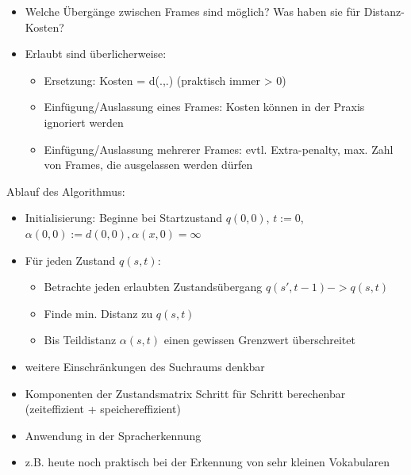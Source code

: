 \documentclass[a4paper,10pt,oneside]{article}
\begin{document}
 		\begin{itemize}
 			\item Welche Übergänge zwischen Frames sind möglich? Was haben sie für Distanz-Kosten?
 			\item Erlaubt sind überlicherweise:
 				\begin{itemize}
 					\item Ersetzung: Kosten = d(.,.) (praktisch immer > 0)
 					\item Einfügung/Auslassung eines Frames: Kosten können in der Praxis ignoriert werden
 					\item Einfügung/Auslassung mehrerer Frames: evtl. Extra-penalty, max. Zahl von Frames, die ausgelassen werden dürfen
 				\end{itemize}
 		\end{itemize}
\vspace{5px}
\flushleft Ablauf des Algorithmus:
 			\begin{itemize}
 				\item Initialisierung: Beginne bei Startzustand $q(0,0)$, $t:=0$, $\alpha(0,0):=d(0,0), \alpha(x,0)=\infty$
 				\item Für jeden Zustand $q(s,t)$:
 					\begin{itemize}
 						\item Betrachte jeden erlaubten Zustandsübergang $q(s',t-1) -> q(s,t)$
 						\item Finde min. Distanz zu $q(s,t)$
 						\item Bis Teildistanz $\alpha(s,t)$ einen gewissen Grenzwert überschreitet
 					\end{itemize}
 				\item weitere Einschränkungen des Suchraums denkbar
 				\item Komponenten der Zustandsmatrix Schritt für Schritt berechenbar (zeiteffizient + speichereffizient)
 			\end{itemize}
 		\begin{itemize}
 			\item Anwendung in der Spracherkennung
 			\item z.B. heute noch praktisch bei der Erkennung von sehr kleinen Vokabularen
		\end{itemize} 	
		
\end{document}
